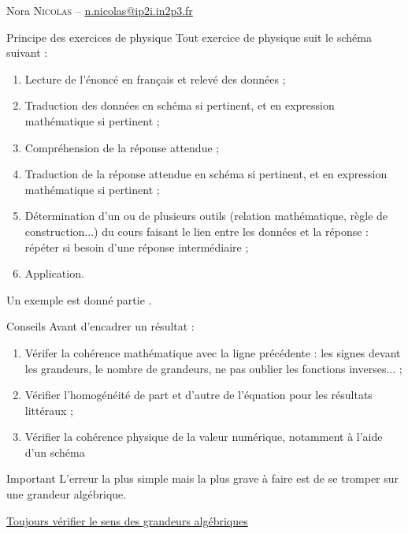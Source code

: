 \documentclass[../main/main.tex]{subfiles}
\begin{document}
Nora \textsc{Nicolas} --
\href{mailto:n.nicolas@ip2i.in2p3.fr}{n.nicolas@ip2i.in2p3.fr}\\

\begin{NCprop}{Principe des exercices de physique}
    Tout exercice de physique suit le schéma suivant :
    \begin{enumerate}
        \item Lecture de l'énoncé en français et relevé des données ;
        \item Traduction des données en schéma si pertinent, et en expression
            mathématique si pertinent ;
        \item Compréhension de la réponse attendue ;
        \item Traduction de la réponse attendue en schéma si pertinent, et en
            expression mathématique si pertinent ;
        \item Détermination d'un ou de plusieurs outils (relation mathématique,
            règle de construction...) du cours faisant le lien entre les données
            et la réponse : répéter si besoin d'une réponse intermédiaire ;
        \item Application.
    \end{enumerate}
    Un exemple est donné partie .
\end{NCprop}

\begin{NCcoro}{Conseils}
    Avant d'encadrer un résultat :
    \begin{enumerate}
        \item Vérifer la cohérence mathématique avec la ligne précédente : les
            signes devant les grandeurs, le nombre de grandeurs, ne pas oublier
            les fonctions inverses... ;
        \item Vérifier l'homogénéité de part et d'autre de l'équation pour les
            résultats littéraux ;
        \item Vérifier la cohérence physique de la valeur numérique, notamment à
            l'aide d'un schéma
    \end{enumerate}
\end{NCcoro}

\begin{NCimpo}{Important}
    L'erreur la plus simple mais la plus grave à faire est de se tromper sur une
    grandeur algébrique.
    \begin{center}
        \underline{Toujours vérifier le sens des grandeurs algébriques} 
    \end{center}
\end{NCimpo}
\end{document}

